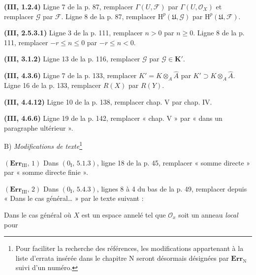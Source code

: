 \noindent\textbf{(III, 1.2.4)} Ligne 7 de la p. 87, remplacer
$\Gamma(U,\mathscr F)$ par $\Gamma(U,\mathscr O_X)$ et remplacer $\mathscr G$
par $\mathscr F$. Ligne 8 de la p. 87, remplacer
$\mathrm H^p(\mathfrak U,\mathscr G)$ par $\mathrm H^p(\mathfrak U,\mathscr F)$.

\noindent\textbf{(III, 2.5.3.1)} Ligne 3 de la p. 111, remplacer $n>0$ par
$n\geq0$. Ligne 8 de la p. 111, remplacer $-r\leq n\leq0$ par
$-r\leq n<0$.

\noindent\textbf{(III, 3.1.2)} Ligne 13 de la p. 116, remplacer $\mathscr G$
par $\mathscr G\in\mathbf K'$.

\noindent\textbf{(III, 4.3.6)} Ligne 7 de la p. 133, remplacer
$K'=K\otimes_A\widehat A$ par $K'\supset K\otimes_A\widehat A$. Ligne 16 de
la p. 133, remplacer $R(X)$ par $R(Y)$.

\noindent\textbf{(III, 4.4.12)} Ligne 10 de la p. 138, remplacer chap. V par
chap. IV.

\noindent\textbf{(III, 4.6.6)} Ligne 19 de la p. 142, remplacer « chap. V » par
« dans un paragraphe ultérieur ».

\begin{center}
B) \emph{Modifications de texte}\footnote{Pour faciliter la recherche des
références, les modifications appartenant à la liste d'errata insérée dans le
chapitre N seront désormais désignées par $\mathbf{Err}_{\mathrm N}$ suivi d'un
numéro.}
\end{center}

\noindent\textbf{$(\mathbf{Err}_{\mathrm{III}},\,1)$} Dans
$(0_{\mathrm I},\,5.1.3)$, ligne 18 de la p. 45, remplacer « somme directe »
par « somme directe finie ».

\noindent\textbf{$(\mathbf{Err}_{\mathrm{III}},\,2)$} Dans
$(0_{\mathrm I},\,5.4.3)$, lignes 8 à 4 du bas de la p. 49, remplacer depuis
« Dans le cas général\ldots{} » par le texte suivant :

Dans le cas général où $X$ est un espace annelé tel que $\mathscr O_x$ soit un
anneau \emph{local} pour
